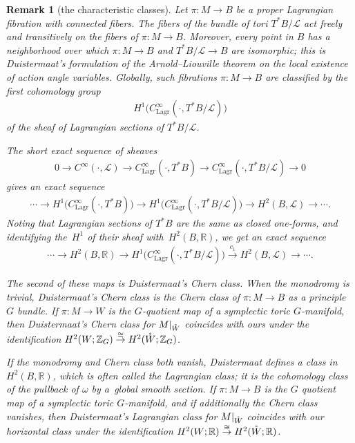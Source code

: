 \documentclass[10pt,a4paper]{amsart}
\numberwithin{equation}{section}
\newtheorem{Remark}[Lemma]{Remark}
\begin{document}
\begin{Remark}[the characteristic classes] \label{rmrk:1.9}
Let $\pi \colon M \to B$ be a proper Lagrangian f\/ibration with connected f\/ibers.
The f\/ibers of the bundle of tori $T^*B/{\mathcal L}$ act freely and transitively
on the f\/ibers of $\pi \colon M \to B$.
Moreover, every point in $B$ has a neighborhood over which
$\pi \colon M \to B$ and $T^*B/{\mathcal L} \to B$ are isomorphic;
this is Duistermaat's formulation of the Arnold--Liouville theorem
on the local existence of action angle variables.
Globally, such f\/ibrations $\pi \colon M \to B$
are classif\/ied by the f\/irst cohomology group
\begin{gather*}
 H^1 \big( C^{\infty}_{\text{Lagr}} (\cdot,T^*B/{\mathcal L}) \big)
 \end{gather*}
of the sheaf of Lagrangian sections of $T^*B/{\mathcal L}$.

The short exact sequence of sheaves
\begin{gather*}
 0 \to C^{\infty}(\cdot,{\mathcal L}) \to C^{\infty}_{\text{Lagr}} (\cdot,T^*B)
  \to C^{\infty}_{\text{Lagr}}(\cdot,T^*B/{\mathcal L}) \to 0
\end{gather*}
gives an exact sequence
\begin{gather*}
 \cdots \to
   H^1\big(C^{\infty}_{\text{Lagr}}(\cdot,T^*B)\big) \to H^1\big(C^{\infty}_{\text{Lagr}}(\cdot,T^*B/{\mathcal L})\big)
   \to H^2(B,{\mathcal L}) \to \cdots .
\end{gather*}
Noting that Lagrangian sections of $T^*B$ are the same as closed one-forms,
and identifying the~$H^1$ of their sheaf with~$H^2(B,{\mathbb R})$,
we get an exact sequence
\begin{gather} \label{exact Duis}
 \cdots \to
 H^2(B,{\mathbb R}) \to H^1\big(C^{\infty}_{\text{Lagr}}(\cdot,T^*B/{\mathcal L})\big) \stackrel{c_1}{\to}
 H^2(B,{\mathcal L})
 \to \cdots.
\end{gather}

The second of these maps is Duistermaat's Chern class.  When the monodromy
is trivial, Duistermaat's Chern class is the Chern class
of $\pi \colon M \to B$ as a principle $G$ bundle.
If $\pi \colon M \to W$ is the $G$-quotient map of a symplectic toric
$G$-manifold, then Duistermaat's Chern class for $M|_{{\mathaccent23{W}}}$
coincides with ours under the identif\/ication
$H^2(W;{\mathbb Z}_G) \stackrel{\cong}{\to} H^2({\mathaccent23{W}};{\mathbb Z}_G)$.

If the monodromy and Chern class both vanish, Duistermaat def\/ines a class
in $H^2(B,{\mathbb R})$, which is often called the \textit{Lagrangian class};
it is the cohomology class of the pullback of $\omega$ by a~global smooth
section.  If $\pi \colon M \to B$ is the $G$ quotient map of a symplectic toric
$G$-manifold, and if additionally the Chern class vanishes,
then Duistermaat's Lagrangian class for $M|_{{\mathaccent23{W}}}$ coincides
with our horizontal class under the identif\/ication
$H^2(W;{\mathbb R}) \stackrel{\cong}{\to} H^2({\mathaccent23{W}};{\mathbb R})$.
\end{Remark}
\end{document}
